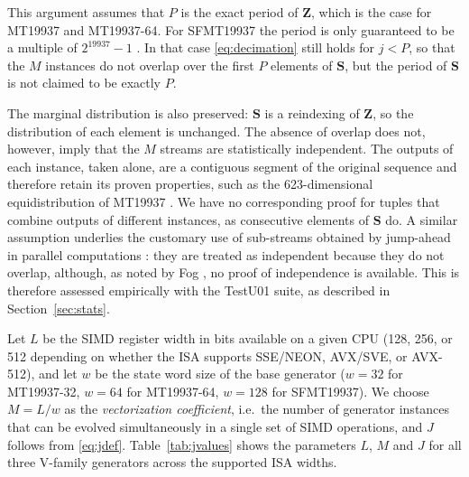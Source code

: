 \documentclass[preprint,1p,times]{elsarticle}
\begin{document}
This argument assumes that $P$ is the exact period of $\boldsymbol{Z}$, which is the case for MT19937 and MT19937-64. For SFMT19937 the period is only guaranteed to be a multiple of $2^{19937}-1$ \cite{sfmt19937}. In that case \eqref{eq:decimation} still holds for $j < P$, so that the $M$ instances do not overlap over the first $P$ elements of $\boldsymbol{S}$, but the period of $\boldsymbol{S}$ is not claimed to be exactly $P$.

The marginal distribution is also preserved: $\boldsymbol{S}$ is a reindexing of $\boldsymbol{Z}$, so the distribution of each element is unchanged. The absence of overlap does not, however, imply that the $M$ streams are statistically independent.
The outputs of each instance, taken alone, are a contiguous segment of the original sequence and therefore retain its proven properties, such as the 623-dimensional equidistribution of MT19937 \cite{mt19937}. We have no corresponding proof for tuples that combine outputs of different instances, as consecutive elements of $\boldsymbol{S}$ do. A similar assumption underlies the customary use of sub-streams obtained by jump-ahead in parallel computations \cite{multistream}: they are treated as independent because they do not overlap, although, as noted by Fog \cite{fog}, no proof of independence is available. This is therefore assessed empirically with the TestU01 suite, as described in Section~\ref{sec:stats}.

Let $L$ be the SIMD register width in bits available on a given CPU (128, 256, or 512 depending on whether the ISA supports SSE/NEON, AVX/SVE, or AVX-512), and let $w$ be the state word size of the base generator ($w=32$ for MT19937-32, $w=64$ for MT19937-64, $w=128$ for SFMT19937). We choose $M=L/w$ as the \emph{vectorization coefficient}, i.e.\ the number of generator instances that can be evolved simultaneously in a single set of SIMD operations, and $J$ follows from \eqref{eq:jdef}. Table~\ref{tab:jvalues} shows the parameters $L$, $M$ and $J$ for all three V-family generators across the supported ISA widths.
\end{document}
